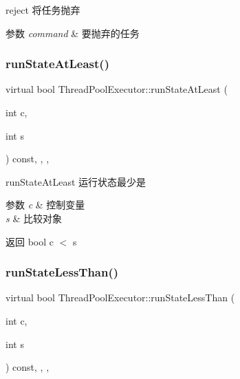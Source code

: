 reject 将任务抛弃 


\begin{DoxyParams}{参数}
{\em command} & 要抛弃的任务 \\
\hline
\end{DoxyParams}
\mbox{\label{classThreadPoolExecutor_a44ee48ed44faa12fc6373074e9059e4e}} 
\subsubsection{\texorpdfstring{run\+State\+At\+Least()}{runStateAtLeast()}}
{\footnotesize\ttfamily virtual bool Thread\+Pool\+Executor\+::run\+State\+At\+Least (\begin{DoxyParamCaption}\item[{int}]{c,  }\item[{int}]{s }\end{DoxyParamCaption}) const\hspace{0.3cm}{\ttfamily [inline]}, {\ttfamily [final]}, {\ttfamily [protected]}, {\ttfamily [virtual]}}



run\+State\+At\+Least 运行状态最少是 


\begin{DoxyParams}{参数}
{\em c} & 控制变量 \\
\hline
{\em s} & 比较对象\\
\hline
\end{DoxyParams}
\begin{DoxyReturn}{返回}
bool c $<$ s 
\end{DoxyReturn}
\mbox{\label{classThreadPoolExecutor_aa12a3efb879080453fb7abc486585698}} 
\subsubsection{\texorpdfstring{run\+State\+Less\+Than()}{runStateLessThan()}}
{\footnotesize\ttfamily virtual bool Thread\+Pool\+Executor\+::run\+State\+Less\+Than (\begin{DoxyParamCaption}\item[{int}]{c,  }\item[{int}]{s }\end{DoxyParamCaption}) const\hspace{0.3cm}{\ttfamily [inline]}, {\ttfamily [final]}, {\ttfamily [protected]}, {\ttfamily [virtual]}}



